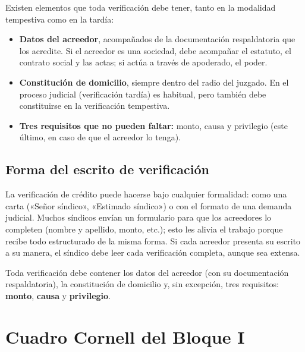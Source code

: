 \documentclass[12pt,oneside]{book}
\begin{document}
Existen elementos que toda verificación debe tener, tanto en la modalidad tempestiva como en la tardía:

\begin{itemize}
    \item \textbf{Datos del acreedor}, acompañados de la documentación respaldatoria que los acredite. Si el acreedor es una sociedad, debe acompañar el estatuto, el contrato social y las actas; si actúa a través de apoderado, el poder.
    \item \textbf{Constitución de domicilio}, siempre dentro del radio del juzgado. En el proceso judicial (verificación tardía) es habitual, pero también debe constituirse en la verificación tempestiva.
    \item \textbf{Tres requisitos que no pueden faltar:} monto, causa y privilegio (este último, en caso de que el acreedor lo tenga).
\end{itemize}

\subsection{Forma del escrito de verificación}

La verificación de crédito puede hacerse bajo cualquier formalidad: como una carta («Señor síndico», «Estimado síndico») o con el formato de una demanda judicial. Muchos síndicos envían un formulario para que los acreedores lo completen (nombre y apellido, monto, etc.); esto les alivia el trabajo porque recibe todo estructurado de la misma forma. Si cada acreedor presenta su escrito a su manera, el síndico debe leer cada verificación completa, aunque sea extensa.

\begin{important}
Toda verificación debe contener los datos del acreedor (con su documentación respaldatoria), la constitución de domicilio y, sin excepción, tres requisitos: \textbf{monto}, \textbf{causa} y \textbf{privilegio}.
\end{important}

\section{Cuadro Cornell del Bloque I}
\end{document}
